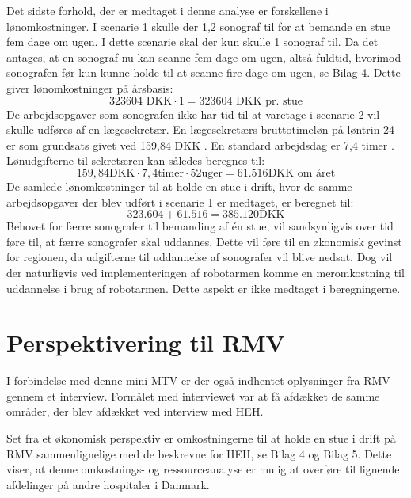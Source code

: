 Det sidste forhold, der er medtaget i denne analyse er forskellene i lønomkostninger. I scenarie 1 skulle der 1,2 sonograf til for at bemande en stue fem dage om ugen. I dette scenarie skal der kun skulle 1 sonograf til. Da det antages, at en sonograf nu kan scanne fem dage om ugen, altså fuldtid, hvorimod sonografen før kun kunne holde til at scanne fire dage om ugen, se Bilag 4. Dette giver lønomkostninger på årsbasis:
\begin{equation}
323604 \text{ DKK}\cdot1 = 323604 \text{ DKK pr. stue}
\end{equation}
De arbejdsopgaver som sonografen ikke har tid til at varetage i scenarie 2 vil skulle udføres af en lægesekretær. En lægesekretærs bruttotimeløn på løntrin 24 er som grundsats givet ved 159,84 DKK \cite{Lontabel}. En standard arbejdsdag er 7,4 timer \cite{Arbejdstid}. Lønudgifterne til sekretæren kan således beregnes til:
\begin{equation}
159,84 \text{DKK} \cdot 7,4 \text{timer} \cdot 52 \text{uger} = 61.516 \text{DKK om året}
\end{equation}
De samlede lønomkostninger til at holde en stue i drift, hvor de samme arbejdsopgaver der blev udført i scenarie 1 er medtaget, er beregnet til:
\begin{equation}
323.604 + 61.516 = 385.120 \text{DKK}
\end{equation}
Behovet for færre sonografer til bemanding af én stue, vil sandsynligvis over tid føre til, at færre sonografer skal uddannes. Dette vil føre til en økonomisk gevinst for regionen, da udgifterne til uddannelse af sonografer vil blive nedsat. Dog vil der naturligvis ved implementeringen af robotarmen komme en meromkostning til uddannelse i brug af robotarmen. Dette aspekt er ikke medtaget i beregningerne. 

\section{Perspektivering til RMV}
I forbindelse med denne mini-MTV er der også indhentet oplysninger fra RMV gennem et interview. Formålet med interviewet var at få afdækket de samme områder, der blev afdækket ved interview med HEH. 

Set fra et økonomisk perspektiv er omkostningerne til at holde en stue i drift på RMV sammenlignelige med de beskrevne for HEH, se Bilag 4 og Bilag 5. Dette viser, at denne omkostnings- og ressourceanalyse er mulig at overføre til lignende afdelinger på andre hospitaler i Danmark.

